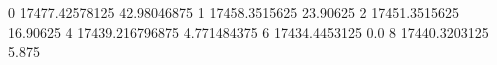 0 17477.42578125 42.98046875
1 17458.3515625 23.90625
2 17451.3515625 16.90625
4 17439.216796875 4.771484375
6 17434.4453125 0.0
8 17440.3203125 5.875
